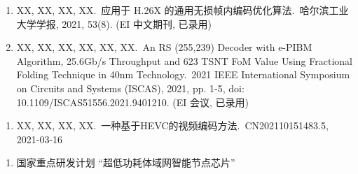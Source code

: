 \begin{publications}
    \begin{enumerate}
        \item XX, XX, XX, XX.\,
              应用于 H.26X 的通用无损帧内编码优化算法.\,
              哈尔滨工业大学学报, 2021, 53(8). (EI 中文期刊, 已录用)

        \item XX, XX, XX, XX, XX, XX.\,
              An RS (255,239) Decoder with e-PIBM Algorithm, 25.6Gb/s Throughput and 623 TSNT FoM Value Using Fractional Folding Technique in 40nm Technology.\,
              2021 IEEE International Symposium on Circuits and Systems (ISCAS), 2021, pp. 1-5, doi: 10.1109/ISCAS51556.2021.9401210. (EI 会议, 已录用)
    \end{enumerate}

    \begin{enumerate}
        \item XX, XX, XX, XX.\,
              一种基于HEVC的视频编码方法.\,
              CN202110151483.5, 2021-03-16
    \end{enumerate}

    \begin{enumerate}
        \item 国家重点研发计划 “超低功耗体域网智能节点芯片”
    \end{enumerate}
\end{publications}